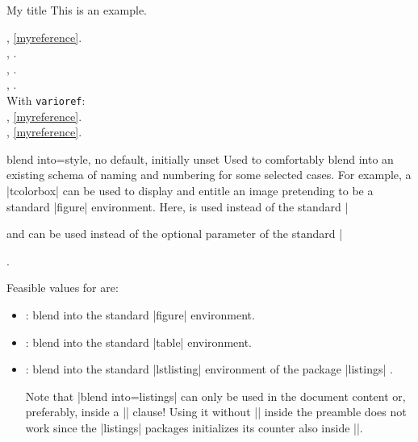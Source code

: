 \begin{dispExample}
\begin{mybluebox}[label={myreference}]{My title}
This is an example.
\end{mybluebox}

, \cref{myreference}.\\
, .\\
, .\\
, .\\
With \texttt{varioref}:\\
, \vref{myreference}.\\
, \vref*{myreference}.
\end{dispExample}

\clearpage

\begin{newTcbKey}[][doc new=2014-09-19]{blend into}{=}{style, no default, initially unset}
Used to comfortably blend into an existing schema of naming and numbering for
some selected cases. For example, a |tcolorbox| can be used to display
and entitle an image pretending to be a standard |figure| environment.
Here,  is used instead of the standard |\caption|
and  can be used instead of the optional parameter
of the standard |\caption|.

Feasible values for  are:
\begin{itemize}
\item{}: blend into the standard |figure| environment.
\item{}: blend into the standard |table| environment.
\item{}: blend into the standard |lstlisting| environment
  of the package |listings| \cite{hoffmann:listings}.
  \begin{marker}
  Note that |blend into=listings| can only be used in the document content
  or, preferably, inside a |\AtBeginDocument| clause! Using it without
  |\AtBeginDocument| inside the preamble does not work since the |listings|
  packages initializes its counter also inside |\AtBeginDocument|.
  \end{marker}
\end{itemize}
\end{newTcbKey}


